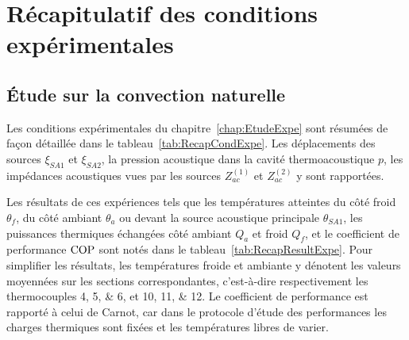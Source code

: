 \chapter{Récapitulatif des conditions expérimentales}
\section{\'Etude sur la convection naturelle}
Les conditions expérimentales du chapitre~\ref{chap:EtudeExpe} sont résumées de façon détaillée dans le tableau~\ref{tab:RecapCondExpe}. Les déplacements des sources $\xi_{SA1}$ et $\xi_{SA2}$, la pression acoustique dans la cavité thermoacoustique $p$, les impédances acoustiques vues par les sources $Z_{ac}^{(1)}$ et $Z_{ac}^{(2)}$ y sont rapportées.

Les résultats de ces expériences tels que les températures atteintes du côté froid $\theta_f$, du côté ambiant $\theta_a$ ou devant la source acoustique principale $\theta_{SA1}$, les puissances thermiques échangées côté ambiant $Q_a$ et froid $Q_f$, et le coefficient de performance $\mathrm{COP}$ sont notés dans le tableau~\ref{tab:RecapResultExpe}. Pour simplifier les résultats, les températures froide et ambiante y dénotent les valeurs moyennées sur les sections correspondantes, c'est-à-dire respectivement les thermocouples \numlist{4;5;6}, et \numlist{10;11;12}. Le coefficient de performance est rapporté à celui de Carnot, car dans le protocole d'étude des performances les charges thermiques sont fixées et les températures libres de varier.

